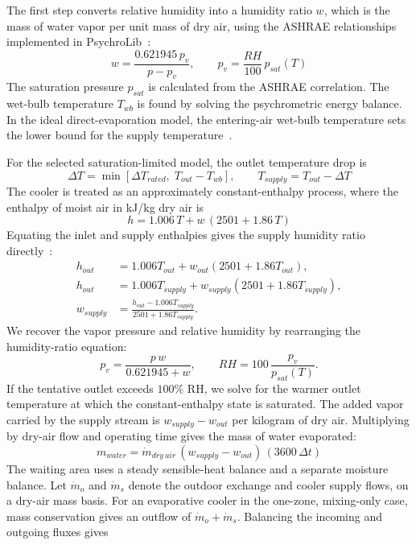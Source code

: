 The first step converts relative humidity into a humidity ratio $w$, which is the mass of water vapor per unit mass of dry air, using the ASHRAE relationships implemented in PsychroLib~\cite{psychrolib_volume}:
\begin{equation}
w = \frac{0.621945\, p_v}{p - p_v}, \qquad p_v = \frac{RH}{100}\, p_{sat}(T)
\end{equation}
The saturation pressure $p_{sat}$ is calculated from the ASHRAE correlation. The wet-bulb temperature $T_{wb}$ is found by solving the psychrometric energy balance. In the ideal direct-evaporation model, the entering-air wet-bulb temperature sets the lower bound for the supply temperature~\cite{pnnl_evaporative}.
 
For the selected saturation-limited model, the outlet temperature drop is
\begin{equation}
\Delta T = \min\left[\Delta T_{rated},\; T_{out} - T_{wb}\right], \qquad T_{supply} = T_{out} - \Delta T
\end{equation}
The cooler is treated as an approximately constant-enthalpy process, where the enthalpy of moist air in kJ/kg dry air is~\cite{psychrolib_volume}
\begin{equation}
h = 1.006\,T + w\,(2501 + 1.86\,T)
\end{equation}
Equating the inlet and supply enthalpies gives the supply humidity ratio directly~\cite{psychrolib_volume}:
\begin{align}
h_{out} &= 1.006T_{out}+w_{out}(2501+1.86T_{out}), \\
h_{out} &= 1.006T_{supply}+w_{supply}(2501+1.86T_{supply}), \\
w_{supply} &= \frac{h_{out}-1.006T_{supply}}{2501+1.86T_{supply}}.
\end{align}
We recover the vapor pressure and relative humidity by rearranging the humidity-ratio equation:
\begin{equation}
p_v=\frac{p\,w}{0.621945+w},
\qquad RH=100\,\frac{p_v}{p_{sat}(T)}.
\end{equation}
If the tentative outlet exceeds $100\%$ RH, we solve for the warmer outlet temperature at which the constant-enthalpy state is saturated. The added vapor carried by the supply stream is $w_{supply}-w_{out}$ per kilogram of dry air. Multiplying by dry-air flow and operating time gives the mass of water evaporated:
\begin{equation}
m_{water} = \dot{m}_{dry\ air}\,(w_{supply} - w_{out})\,(3600\,\Delta t)
\end{equation}
The waiting area uses a steady sensible-heat balance and a separate moisture balance. Let $\dot m_o$ and $\dot m_s$ denote the outdoor exchange and cooler supply flows, on a dry-air mass basis. For an evaporative cooler in the one-zone, mixing-only case, mass conservation gives an outflow of $\dot m_o+\dot m_s$. Balancing the incoming and outgoing fluxes gives
